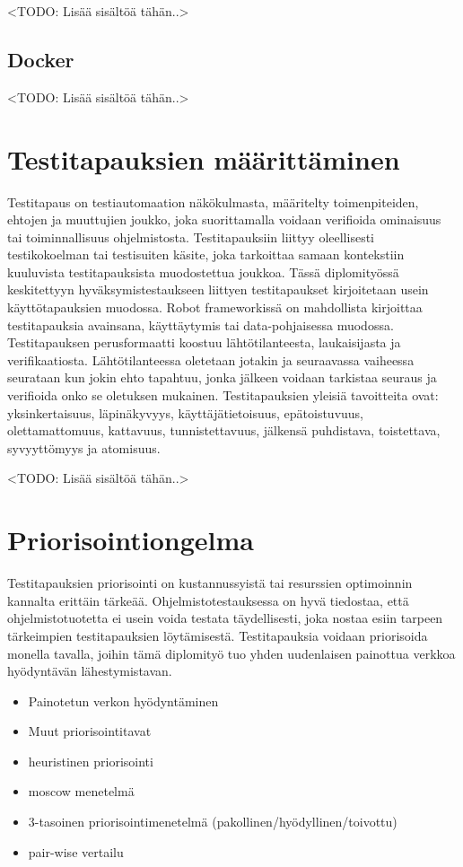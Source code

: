     <TODO: Lisää sisältöä tähän..>

  \subsection{Docker} \label{ch:08_docker}

    <TODO: Lisää sisältöä tähän..>

\section{Testitapauksien määrittäminen} \label{ch:08_testitapauksien_maarittaminen}

  Testitapaus on testiautomaation näkökulmasta, määritelty toimenpiteiden, ehtojen ja muuttujien joukko, joka suorittamalla voidaan verifioida ominaisuus tai toiminnallisuus ohjelmistosta.
  Testitapauksiin liittyy oleellisesti testikokoelman tai testisuiten käsite, joka tarkoittaa samaan kontekstiin kuuluvista testitapauksista muodostettua joukkoa.
  Tässä diplomityössä keskitettyyn hyväksymistestaukseen liittyen testitapaukset kirjoitetaan usein käyttötapauksien muodossa.
  Robot frameworkissä on mahdollista kirjoittaa testitapauksia avainsana, käyttäytymis tai data-pohjaisessa muodossa.
  Testitapauksen perusformaatti koostuu lähtötilanteesta, laukaisijasta ja verifikaatiosta.
  Lähtötilanteessa oletetaan jotakin ja seuraavassa vaiheessa seurataan kun jokin ehto tapahtuu, jonka jälkeen voidaan tarkistaa seuraus ja verifioida onko se oletuksen mukainen.
  Testitapauksien yleisiä tavoitteita ovat: yksinkertaisuus, läpinäkyvyys, käyttäjätietoisuus, epätoistuvuus, olettamattomuus, kattavuus, tunnistettavuus, jälkensä puhdistava, toistettava, syvyyttömyys ja atomisuus.

  <TODO: Lisää sisältöä tähän..>




\section{Priorisointiongelma} \label{ch:08_priorisointiongelma}

  Testitapauksien priorisointi on kustannussyistä tai resurssien optimoinnin kannalta erittäin tärkeää.
  Ohjelmistotestauksessa on hyvä tiedostaa, että ohjelmistotuotetta ei usein voida testata täydellisesti, joka nostaa esiin tarpeen tärkeimpien testitapauksien löytämisestä.
  Testitapauksia voidaan priorisoida monella tavalla, joihin tämä diplomityö tuo yhden uudenlaisen painottua verkkoa hyödyntävän lähestymistavan.

  \begin{itemize}
    \item Painotetun verkon hyödyntäminen
    \item Muut priorisointitavat
    \item heuristinen priorisointi
    \item moscow menetelmä
    \item 3-tasoinen priorisointimenetelmä (pakollinen/hyödyllinen/toivottu)
    \item pair-wise vertailu
  \end{itemize}